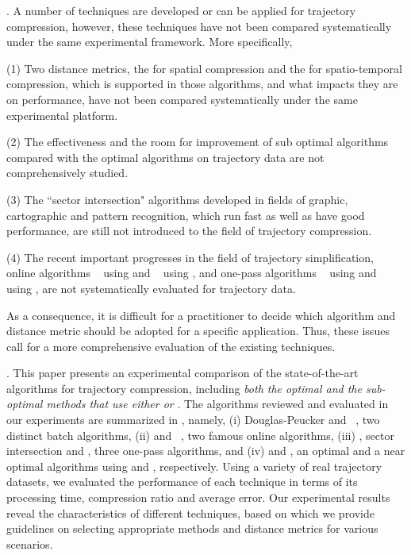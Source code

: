 . A number of techniques are developed or can be applied for trajectory compression, however, these techniques have not been compared systematically under the same experimental framework.
More specifically, 

\ni (1) Two distance metrics, \ie the \ped for spatial compression and the \sed \cite{Meratnia:Spatiotemporal} for spatio-temporal compression, which is supported in those algorithms, and what impacts they are on performance, have not been compared systematically under the same experimental platform. 

\ni (2) The effectiveness and the room for improvement of sub optimal \lsa algorithms compared with the optimal \lsa algorithms on trajectory data are not comprehensively studied.

\ni (3) The ``sector intersection" algorithms \cite{Williams:Longest, Sklansky:Cone, Dunham:Cone, Zhao:Sleeve} developed in fields of graphic, cartographic and pattern recognition, which run fast as well as have good performance, are still not introduced to the field of trajectory compression.

\ni (4) The recent important progresses in the field of trajectory simplification, \ie online algorithms \squishe~\cite{Muckell:Compression} using \sed and \bqsa~\cite{Liu:BQS} using \ped, and one-pass algorithms \operb~\cite{Lin:Operb} using \ped and \cised~\cite{Lin:Cised} using \sed, are not systematically evaluated for trajectory data. 


As a consequence, it is difficult for a practitioner to decide which algorithm and distance metric should be adopted for a specific application. 
Thus, these issues call for a more comprehensive evaluation of the existing \lsa techniques. %

\stitle{\textcolor{blue}{Contributions}}.
This paper presents an experimental comparison of the state-of-the-art \lsa algorithms for trajectory compression, including \emph{both the optimal and the sub-optimal methods that use either \ped or \sed}. 
The algorithms reviewed and evaluated in our experiments are summarized in , namely,
(i) Douglas-Peucker\cite{Douglas:Peucker,Meratnia:Spatiotemporal} and \pavlidis~\cite{Pavlidis:Segment}, two distinct batch \lsa algorithms,
(ii) \bqsa\cite{Liu:BQS} and \squishe~\cite{Muckell:SQUISH}, two famous online \lsa algorithms,
(iii) \operb\cite{Lin:Operb}, sector intersection \cite{Williams:Longest,Sklansky:Cone,Dunham:Cone, Zhao:Sleeve} and \cised \cite{Lin:Cised}, three one-pass \lsa algorithms, and
(iv) \opt\cite{Chan:Optimal} and \nopts, an optimal and a near optimal \lsa algorithms using \ped and \sed, respectively.
%
%
Using a variety of real trajectory datasets, we evaluated the performance of each technique in terms of its processing time, compression ratio and average error.
Our experimental results reveal the characteristics of different techniques, based on which we provide guidelines on selecting appropriate methods and distance metrics for various scenarios.


